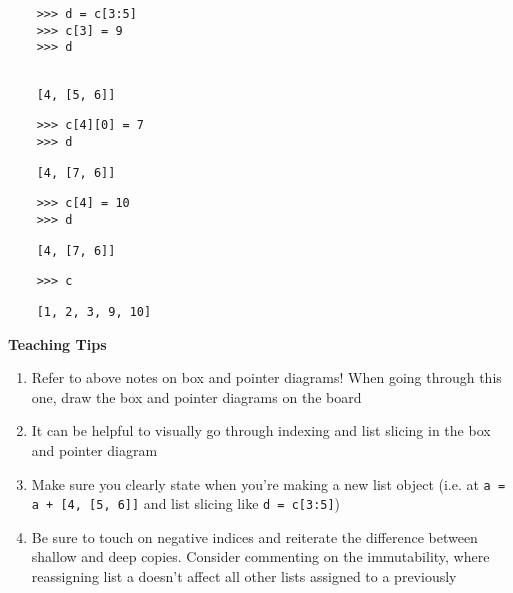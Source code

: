     \begin{blocksection}
    
    \begin{lstlisting}
    >>> d = c[3:5]
    >>> c[3] = 9
    >>> d
    
    \end{lstlisting}
    \begin{solution}[.25in]
    \begin{lstlisting}
    [4, [5, 6]]
    \end{lstlisting}
    \end{solution}
    
    \begin{lstlisting}
    >>> c[4][0] = 7
    >>> d
    \end{lstlisting}
    \begin{solution}[.25in]
    \begin{lstlisting}
    [4, [7, 6]]
    \end{lstlisting}
    \end{solution}
    
    \begin{lstlisting}
    >>> c[4] = 10
    >>> d
    \end{lstlisting}
    \begin{solution}[.25in]
    \begin{lstlisting}
    [4, [7, 6]]
    \end{lstlisting}
    \end{solution}
    
    \begin{lstlisting}
    >>> c
    \end{lstlisting}
    \begin{solution}[.25in]
    \begin{lstlisting}
    [1, 2, 3, 9, 10]
    \end{lstlisting}
    \end{solution}
    
    \end{blocksection}
    
    \begin{blocksection}
        \begin{guide}
        \textbf{Teaching Tips}
        \begin{enumerate}
                \item Refer to above notes on box and pointer diagrams! When going through this one, draw the box and pointer diagrams on the board
                \item It can be helpful to visually go through indexing and list slicing in the box and pointer diagram
                \item Make sure you clearly state when you’re making a new list object (i.e. at \texttt{a = a + [4, [5, 6]]} and list slicing like \texttt{d = c[3:5]})
                \item Be sure to touch on negative indices and reiterate the difference between shallow and deep copies. Consider commenting on the immutability, where reassigning list a doesn't affect all other lists assigned to a previously
        \end{enumerate}
        \end{guide}
    \end{blocksection}